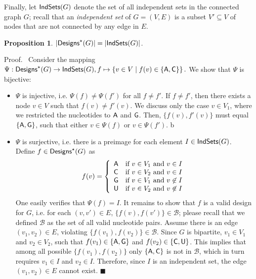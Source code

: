 \documentclass[]{bmcart}
\newtheorem{proposition}[theorem]{Proposition}
\newcommand*{\QEDA}{\hfill\ensuremath{\blacksquare}}%
\newenvironment{proof}[1][]{\noindent Proof\ifthenelse{\equal{#1}{}}{}{ (#1)}.~}{}
\newcommand{\B}{\mathcal{B}}
\newcommand{\Def}[1]{\emph{#1}}
\newcommand{\Design}[1]{{\sf Designs}^{\star}(#1)}
\newcommand{\IS}[1]{{\sf IndSets}(#1)}
\newcommand{\Nuc}[1]{{\sf #1}}
\newcommand{\Ab}{\Nuc{A}}
\newcommand{\Cb}{\Nuc{C}}
\newcommand{\Gb}{\Nuc{G}}
\newcommand{\Ub}{\Nuc{U}}
\begin{document}
Finally, let $\IS{G}$ denote the set of all independent sets in the connected graph $G$; recall that an \Def{independent set} of $G=(V,E)$ is a subset $V'\subseteq V$ of nodes that are not connected by any edge in $E$. 

\begin{proposition}\label{prop:bijection}
  $|\Design{G}| = |\IS{G}|$.
\end{proposition}
%
\begin{proof}
Consider the mapping $\Psi: \Design{G} \to \IS{G}, f \mapsto \left\{v\in V\mid f(v)\in\{\Ab,\Cb\}\right\}.$
We show that $\Psi$ is bijective:%
\begin{itemize}
\item $\Psi$ is injective, i.e. $\Psi(f)\neq\Psi(f')$ for all $f\neq f'$.
If $f\neq f'$, then there exists a node $v\in V$ such that $f(v)\neq f'(v)$.
We discuss only the case $v\in V_1$, where we restricted the nucleotides to $\Ab$ and $\Gb$. Then, $\{f(v),f'(v)\}$ must equal $\{\Ab,\Gb\}$, such that either $v\in\Psi(f)$ or $v\in\Psi(f')$.
%
b\item $\Psi$ is surjective, i.e. there is a preimage for each element $I\in \IS{G}$. Define $f\in\Design{G}$ as\begin{displaymath}
f(v) = \left\{\begin{array}{ll} %
\Ab{} & \text{if $v\in V_1$ and $v\in I$} \\ %
\Cb{} & \text{if $v\in V_2$ and $v\in I$} \\
\Gb{} & \text{if $v\in V_1$ and $v\not\in I$} \\ %
\Ub{} & \text{if $v\in V_2$ and $v\not\in I$}
\end{array}\right.
\end{displaymath}
One easily verifies that $\Psi(f) = I$.
%
%
It remains to show that $f$ is a valid design for $G$, i.e. for each $(v, v') \in E$, $\{f(v),f(v')\}\in \B$; please recall that we defined $\B$ as the set of all valid nucleotide pairs.
Assume there is an edge $(v_1,v_2)\in E$, violating $\{f(v_1),f(v_2)\} \in \B$. Since $G$ is bipartite,
$v_1\in V_1$ and $v_2\in V_2$, such that $f(v_1)\in\{\Ab,\Gb\}$ and $f(v_2)\in\{\Cb,\Ub\}$. This implies that among all possible $\{f(v_1), f(v_2)\}$ only $\{\Ab,\Cb\}$ is not in $\B$, which in turn requires $v_1\in I$ and $v_2\in I$. Therefore, since $I$ is an independent set, the edge $(v_1,v_2)\in E$ cannot exist. \QEDA
\end{itemize}
\end{proof}
\end{document}
